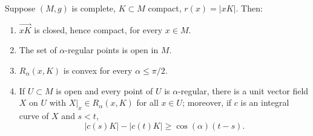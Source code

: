 \begin{proposition}
  \label{prop:pet-ch12-regular-point-properties}
  Suppose $(M,g)$ is complete, $K\subset M$ compact, $r(x)=|xK|$. Then:
  \begin{enumerate}
    \item $\overrightarrow{xK}$ is closed, hence compact, for every $x\in M$.
    \item The set of $\alpha$-regular points is open in $M$.
    \item $R_\alpha(x,K)$ is convex for every $\alpha\le\pi/2$.
    \item If $U\subset M$ is open and every point of $U$ is $\alpha$-regular,
      there is a unit vector field $X$ on $U$ with $X|_x\in R_\alpha(x,K)$ for
      all $x\in U$; moreover, if $c$ is an integral curve of $X$ and $s<t$,
      \[
        |c(s)K|-|c(t)K|\ge\cos(\alpha)(t-s).
      \]
  \end{enumerate}
\end{proposition}
